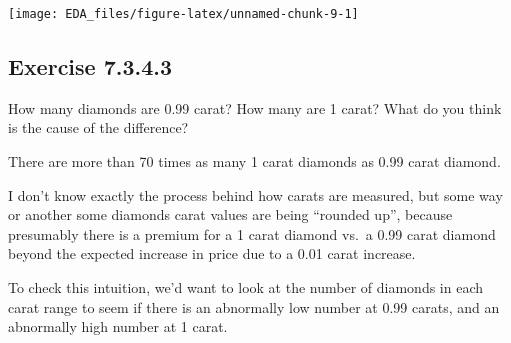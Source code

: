 \documentclass[]{book}
\newenvironment{Shaded}{\begin{snugshade}}{\end{snugshade}}
\newcommand{\CommentTok}[1]{\textcolor[rgb]{0.56,0.35,0.01}{\textit{#1}}}
\newcommand{\DecValTok}[1]{\textcolor[rgb]{0.00,0.00,0.81}{#1}}
\newcommand{\FloatTok}[1]{\textcolor[rgb]{0.00,0.00,0.81}{#1}}
\newcommand{\KeywordTok}[1]{\textcolor[rgb]{0.13,0.29,0.53}{\textbf{#1}}}
\newcommand{\NormalTok}[1]{#1}
\newcommand{\OperatorTok}[1]{\textcolor[rgb]{0.81,0.36,0.00}{\textbf{#1}}}
\newcommand{\StringTok}[1]{\textcolor[rgb]{0.31,0.60,0.02}{#1}}
\theoremstyle{plain}
\theoremstyle{remark}
\begin{document}
\begin{center}\texttt{[image: EDA\_files/figure-latex/unnamed-chunk-9-1]} \end{center}

\hypertarget{exercise-7.3.4.3}{%
\subsection*{\texorpdfstring{Exercise
{7.3.4.3}}{Exercise 7.3.4.3}}\label{exercise-7.3.4.3}}

How many diamonds are 0.99 carat? How many are 1 carat? What do you
think is the cause of the difference?

There are more than 70 times as many 1 carat diamonds as 0.99 carat
diamond.

\begin{Shaded}
\end{Shaded}

I don't know exactly the process behind how carats are measured, but
some way or another some diamonds carat values are being ``rounded up'',
because presumably there is a premium for a 1 carat diamond vs.~a 0.99
carat diamond beyond the expected increase in price due to a 0.01 carat
increase.

To check this intuition, we'd want to look at the number of diamonds in
each carat range to seem if there is an abnormally low number at 0.99
carats, and an abnormally high number at 1 carat.
\end{document}
